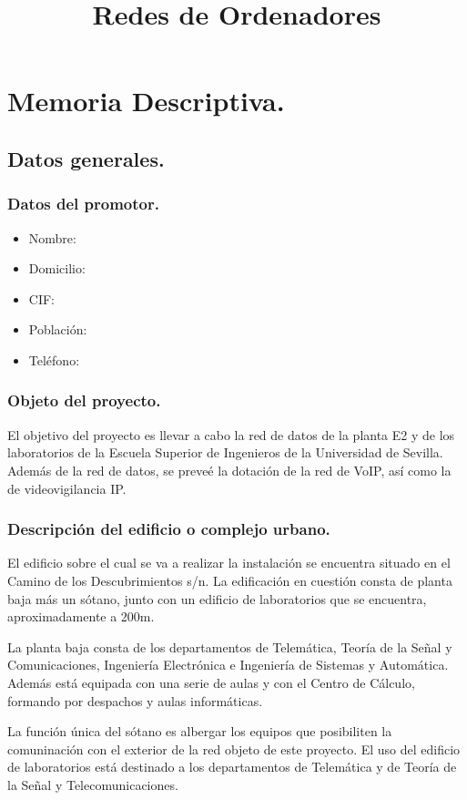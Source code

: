 \documentclass[a4paper,10pt]{article}
\title{Redes de Ordenadores}
\author{}
\date{}
\begin{document}
\maketitle


\section{Memoria Descriptiva.}
\subsection{Datos generales.}
\subsubsection{Datos del promotor.}
\begin{itemize}
 \item Nombre:
 \item Domicilio:
 \item CIF:
 \item Población:
 \item Teléfono:
\end{itemize}

\subsubsection{Objeto del proyecto.}
El objetivo del proyecto es llevar a cabo la red de datos de la planta E2 y de los laboratorios 
de la Escuela Superior de Ingenieros de la Universidad de Sevilla. Además de la red de datos, 
se preveé la dotación de la red de VoIP, así como la de videovigilancia IP.
\subsubsection{Descripción del edificio o complejo urbano.}
El edificio sobre el cual se va a realizar la instalación se encuentra situado en el Camino de los
Descubrimientos s/n. La edificación en cuestión consta de planta baja más un sótano, junto con un
edificio de laboratorios que se encuentra, aproximadamente a 200m.

La planta baja consta de los departamentos de Telemática, Teoría de la Señal y Comunicaciones, 
Ingeniería Electrónica e Ingeniería de Sistemas y Automática. Además está equipada con una serie de
aulas y con el Centro de Cálculo, formando por despachos y aulas informáticas.

La función única del sótano es albergar los equipos que posibiliten la comuninación con el exterior
de la red objeto de este proyecto. El uso del edificio de laboratorios está destinado a los
departamentos de Telemática y de Teoría de la Señal y Telecomunicaciones.
\end{document}
